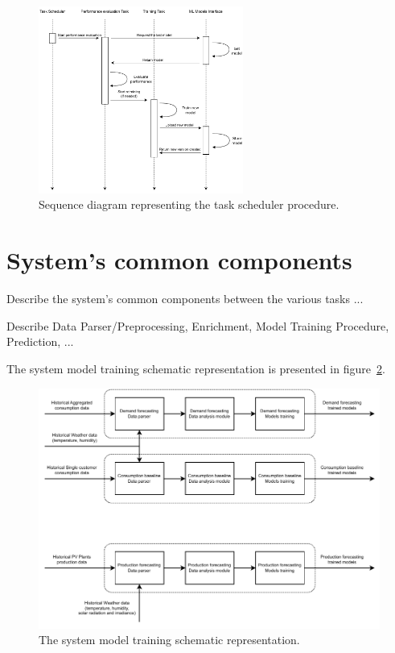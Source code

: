 \begin{figure}[H]
\centering 
\includegraphics[width=0.6\textwidth]{images/architecture_scheduler_sequence}
\caption{Sequence diagram representing the task scheduler procedure.}
\label{fig:schedulersequence}
\end{figure}


\section{System's common components}
\label{sec:components}
\vspace{0.2 cm}

Describe the system's common components between the various tasks ...

Describe Data Parser/Preprocessing, Enrichment, Model Training Procedure, Prediction, ...

The system model training schematic representation is presented in figure~\ref{fig:modeltraining}.

\begin{figure}[H]
\centering 
\includegraphics[width=1\textwidth]{images/system_model_training}
\caption{The system model training schematic representation.}
\label{fig:modeltraining}
\end{figure}

